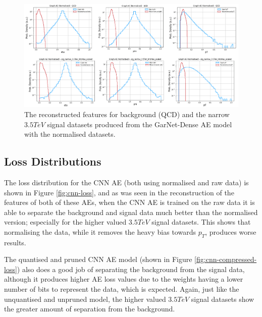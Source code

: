 \documentclass[a4paper]{article}
\theoremstyle{plain}
\theoremstyle{definition}
\begin{document}
            \begin{figure}[H]
                \centering
                \begin{minipage}[b]{\linewidth}
                    \centering
                    \includegraphics[width=\textwidth]{garnet.png}
                    \caption{The reconstructed features for background (QCD) and the narrow $3.5 TeV$ signal datasets produced from the GarNet-Dense AE model with the normalised datasets.}
                    \label{fig:garnet-reconstruction}
                \end{minipage}
            \end{figure}

        \subsection{Loss Distributions}

            The loss distribution for the CNN AE (both using normalised and raw data) is shown in Figure \ref{fig:cnn-loss}, and as was seen in the reconstruction of the features of both of these AEs, when the CNN AE is trained on the raw data it is able to separate the background and signal data much better than the normalised version; especially for the higher valued $3.5 TeV$ signal datasets. This shows that normalising the data, while it removes the heavy bias towards $p_T$, produces worse results. 

            The quantised and pruned CNN AE model (shown in Figure \ref{fig:cnn-compressed-loss}) also does a good job of separating the background from the signal data, although it produces higher AE loss values due to the weights having a lower number of bits to represent the data, which is expected. Again, just like the unquantised and unpruned model, the higher valued $3.5 TeV$ signal datasets show the greater amount of separation from the background. 
\end{document}

